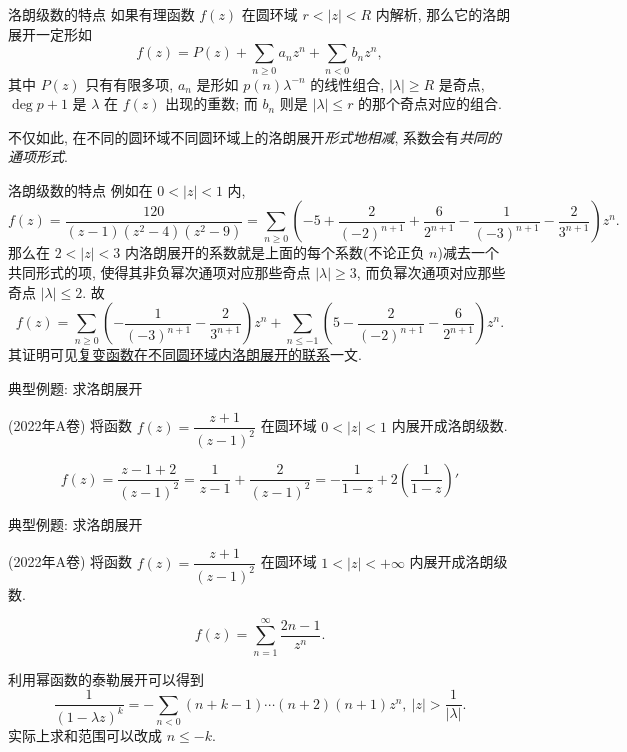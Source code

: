 \begin{frame}{洛朗级数的特点\noexer}
	\onslide<+->
	如果有理函数 $f(z)$ 在圆环域 $r<|z|<R$ 内解析, 那么它的洛朗展开一定形如
	\[f(z)=P(z)+\sum_{n\ge 0}a_n z^n+\sum_{n<0}b_n z^n,\]
	其中 $P(z)$ 只有有限多项, 
	\onslide<+->
	$a_n$ 是形如 $p(n)\lambda^{-n}$ 的线性组合, $|\lambda|\ge R$ 是奇点, $\deg p+1$ 是 $\lambda$ 在 $f(z)$ 出现的重数; 而 $b_n$ 则是 $|\lambda|\le r$ 的那个奇点对应的组合.

	\onslide<+->
	不仅如此, 在不同的圆环域不同圆环域上的洛朗展开{\itshape 形式地相减}, 系数会有\emph{共同的通项形式}.
\end{frame}


\begin{frame}{洛朗级数的特点\noexer}
	\onslide<+->
	例如在 $0<|z|<1$ 内,
	\[f(z)=\frac{120}{(z-1)(z^2-4)(z^2-9)}=\sum_{n\ge 0}\left(-5+\frac2{(-2)^{n+1}}+\frac6{2^{n+1}}-\frac1{(-3)^{n+1}}-\frac2{3^{n+1}}\right)z^n.\]
	\onslide<+->
	那么在 $2<|z|<3$ 内洛朗展开的系数就是上面的每个系数(不论正负 $n$)减去一个共同形式的项, 使得其非负幂次通项对应那些奇点 $|\lambda|\ge 3$, 而负幂次通项对应那些奇点 $|\lambda|\le2$.
	\onslide<+->
	故
	\[f(z)=\sum_{n\ge 0}\left(-\frac1{(-3)^{n+1}}-\frac2{3^{n+1}}\right)z^n+\sum_{n\le-1}\left(5-\frac2{(-2)^{n+1}}-\frac6{2^{n+1}}\right)z^n.\]
	\onslide<+->
	其证明可见\alert{\href{https://zhangshenxing.gitee.io/teaching/publications/袁志杰张神星2023 复变函数在不同圆环域内洛朗展开的联系.pdf}{复变函数在不同圆环域内洛朗展开的联系}}一文.
\end{frame}


\begin{frame}{典型例题: 求洛朗展开}
	\onslide<+->
	\begin{example}
		(2022年A卷) 将函数 $f(z)=\dfrac{z+1}{(z-1)^2}$ 在圆环域 $0<|z|<1$ 内展开成洛朗级数.
	\end{example}

	\onslide<+->
	\begin{solution}
		\[f(z)=\frac{z-1+2}{(z-1)^2}=\frac1{z-1}+\frac{2}{(z-1)^2}=-\frac1{1-z}+2\left(\frac1{1-z}\right)'\]
		\onslide<+->{因此当 $0<|z|<1$ 时,
			\[f(z)=-\sum_{n=0}^\infty z^n+2\left(\sum_{n=0}^\infty z^n\right)'=-\sum_{n=0}^\infty z^n+2\sum_{n=1}^\infty nz^{n-1}
			=\sum_{n=0}^\infty(2n+1)z^n.\]}
	\end{solution}
\end{frame}


\begin{frame}{典型例题: 求洛朗展开}
	\onslide<+->
	\begin{exercise}
		(2022年A卷) 将函数 $f(z)=\dfrac{z+1}{(z-1)^2}$ 在圆环域 $1<|z|<+\infty$ 内展开成洛朗级数.
	\end{exercise}

	\onslide<+->
	\begin{answer}
		\[f(z)=\sum_{n=1}^\infty \frac{2n-1}{z^n}.\]
	\end{answer}
	\onslide<+->
	利用幂函数的泰勒展开可以得到
	\[\frac1{(1-\lambda z)^k}=-\sum_{n<0}(n+k-1)\cdots(n+2)(n+1)z^n,\ |z|>\frac1{|\lambda|}.\]
	\onslide<+->
	实际上求和范围可以改成 $n\le -k$.
\end{frame}


